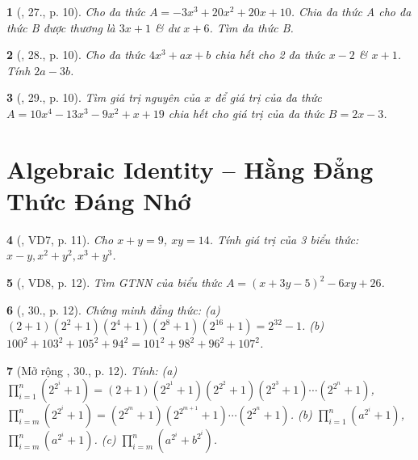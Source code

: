 \documentclass{article}
\newtheorem{baitoan}{}
\begin{document}
\begin{baitoan}[\cite{Tuyen_Toan_8}, 27., p. 10]
	Cho đa thức $A = -3x^3 + 20x^2 + 20x + 10$. Chia đa thức A cho đa thức B được thương là $3x + 1$ \& dư $x + 6$. Tìm đa thức B.
\end{baitoan}

\begin{baitoan}[\cite{Tuyen_Toan_8}, 28., p. 10]
	Cho đa thức $4x^3 + ax + b$ chia hết cho 2 đa thức $x - 2$ \& $x + 1$. Tính $2a - 3b$.
\end{baitoan}

\begin{baitoan}[\cite{Tuyen_Toan_8}, 29., p. 10]
	Tìm giá trị nguyên của $x$ để giá trị của đa thức $A = 10x^4 - 13x^3 - 9x^2 + x + 19$ chia hết cho giá trị của đa thức $B = 2x - 3$.
\end{baitoan}


\section{Algebraic Identity -- Hằng Đẳng Thức Đáng Nhớ}

\begin{baitoan}[\cite{Tuyen_Toan_8}, VD7, p. 11]
	Cho $x + y = 9$, $xy = 14$. Tính giá trị của 3 biểu thức: $x - y,x^2 + y^2,x^3 + y^3$.
\end{baitoan}

\begin{baitoan}[\cite{Tuyen_Toan_8}, VD8, p. 12]
	Tìm {\rm GTNN} của biểu thức $A = (x + 3y - 5)^2 - 6xy + 26$.
\end{baitoan}

\begin{baitoan}[\cite{Tuyen_Toan_8}, 30., p. 12]
	Chứng minh đẳng thức: (a) $(2 + 1)(2^2 + 1)(2^4 + 1)(2^8 + 1)(2^{16} + 1) = 2^{32} - 1$. (b) $100^2 + 103^2 + 105^2 + 94^2 = 101^2 + 98^2 + 96^2 + 107^2$.
\end{baitoan}

\begin{baitoan}[Mở rộng \cite{Tuyen_Toan_8}, 30., p. 12]
	Tính: (a) $\prod_{i=1}^n (2^{2^i} + 1) = (2 + 1)(2^{2^1} + 1)(2^{2^2} + 1)(2^{2^3} + 1)\cdots(2^{2^n} + 1)$, $\prod_{i=m}^n (2^{2^i} + 1) = (2^{2^m} + 1)(2^{2^{m+1}} + 1)\cdots(2^{2^n} + 1)$. (b) $\prod_{i=1}^n (a^{2^i} + 1)$, $\prod_{i=m}^n (a^{2^i} + 1)$. (c) $\prod_{i=m}^n (a^{2^i} + b^{2^i})$.
\end{baitoan}
\end{document}
